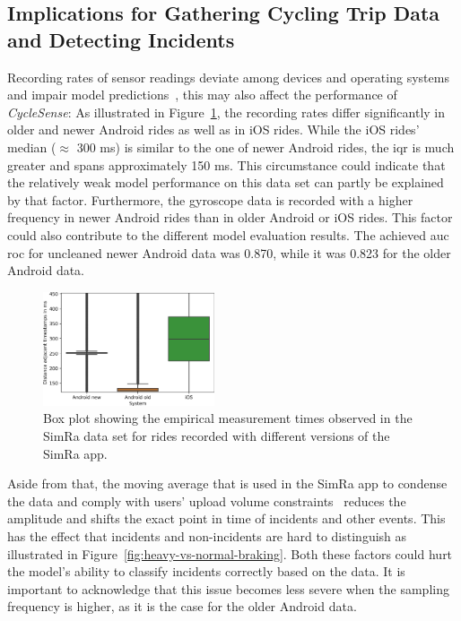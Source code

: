 \subsection*{Implications for Gathering Cycling Trip Data and Detecting Incidents}
Recording rates of sensor readings deviate among devices and operating systems and impair model predictions~\cite{stisen2015smart}, this may also affect the performance of \textit{CycleSense}:
As illustrated in Figure~\ref{fig:emp-measurements}, the recording rates differ significantly in older and newer Android rides as well as in iOS rides.
While the iOS rides' median ($\approx$ 300 ms) is similar to the one of newer Android rides, the \ac{iqr} is much greater and spans approximately 150 ms.
This circumstance could indicate that the relatively weak model performance on this data set can partly be explained by that factor. 
Furthermore, the gyroscope data is recorded with a higher frequency in newer Android rides than in older Android or iOS rides.
This factor could also contribute to the different model evaluation results. 
The achieved \ac{auc} \ac{roc} for uncleaned newer Android data was 0.870, while it was 0.823 for the older Android data.

\begin{figure}[t]
	\centering
	\includegraphics[width=0.45\textwidth]{fig/empirical_measurements.png}
	\caption{Box plot showing the empirical measurement times observed in the SimRa data set for rides recorded with different versions of the SimRa app.}
	\label{fig:emp-measurements}
\end{figure}

Aside from that, the moving average that is used in the SimRa app to condense the data and comply with users' upload volume constraints~\cite{karakaya2020simra} reduces the amplitude and shifts the exact point in time of incidents and other events.
This has the effect that incidents and non-incidents are hard to distinguish as illustrated in Figure~\ref{fig:heavy-vs-normal-braking}.
Both these factors could hurt the model's ability to classify incidents correctly based on the data.
It is important to acknowledge that this issue becomes less severe when the sampling frequency is higher, as it is the case for the older Android data.

